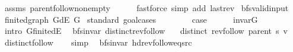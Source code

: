\begin{isabellebody}
\ assms\ parent{\isachardot}{\kern0pt}follow{\isacharunderscore}{\kern0pt}non{\isacharunderscore}{\kern0pt}empty\isanewline
\ \ \ \ \isamarkupfalse%
\ {\isacharparenleft}{\kern0pt}fastforce\ simp\ add{\isacharcolon}{\kern0pt}\ last{\isacharunderscore}{\kern0pt}rev{\isacharparenright}{\kern0pt}\isanewline
{}\isamarkupfalse%
%
\endisatagproof
{\isafoldproof}%
%
\isadelimproof
\isanewline
%
\endisadelimproof
\isanewline
{}\isamarkupfalse%
\ bfs{\isacharunderscore}{\kern0pt}valid{\isacharunderscore}{\kern0pt}input\isanewline
{}\isanewline
{}\isamarkupfalse%
\ finite{\isacharunderscore}{\kern0pt}dgraph\ {\isachardoublequoteopen}G{\isachardot}{\kern0pt}dE\ G{\isachardoublequoteclose}\isanewline
%
\isadelimproof
%
\endisadelimproof
%
\isatagproof
{}\isamarkupfalse%
\ {\isacharparenleft}{\kern0pt}standard{\isacharcomma}{\kern0pt}\ goal{\isacharunderscore}{\kern0pt}cases{\isacharparenright}{\kern0pt}\isanewline
\ \ \isamarkupfalse%
\ {}\isanewline
\ \ \isamarkupfalse%
\ {\isacharquery}{\kern0pt}case\isanewline
\ \ \ \ \isamarkupfalse%
\ invar{\isacharunderscore}{\kern0pt}G\isanewline
\ \ \ \ \isamarkupfalse%
\ {\isacharparenleft}{\kern0pt}intro\ G{\isachardot}{\kern0pt}finite{\isacharunderscore}{\kern0pt}dE{\isacharparenright}{\kern0pt}\isanewline
{}\isamarkupfalse%
%
\endisatagproof
{\isafoldproof}%
%
\isadelimproof
\isanewline
%
\endisadelimproof
{}\isamarkupfalse%
\isanewline
\isanewline
{}\isamarkupfalse%
\ {\isacharparenleft}{\kern0pt}\ bfs{\isacharunderscore}{\kern0pt}invar{\isacharparenright}{\kern0pt}\ distinct{\isacharunderscore}{\kern0pt}rev{\isacharunderscore}{\kern0pt}follow{\isacharcolon}{\kern0pt}\isanewline
\ \ \ {\isachardoublequoteopen}distinct\ {\isacharparenleft}{\kern0pt}rev{\isacharunderscore}{\kern0pt}follow\ {\isacharparenleft}{\kern0pt}parent\ s{\isacharparenright}{\kern0pt}\ v{\isacharparenright}{\kern0pt}{\isachardoublequoteclose}\isanewline
%
\isadelimproof
\ \ %
\endisadelimproof
%
\isatagproof
{}\isamarkupfalse%
\ distinct{\isacharunderscore}{\kern0pt}follow\isanewline
\ \ \isamarkupfalse%
\ simp%
\endisatagproof
{\isafoldproof}%
%
\isadelimproof
\isanewline
%
\endisadelimproof
%
\isadeliminvisible
\isanewline
%
\endisadeliminvisible
%
\isataginvisible
{}\isamarkupfalse%
\ {\isacharparenleft}{\kern0pt}\ bfs{\isacharunderscore}{\kern0pt}invar{\isacharparenright}{\kern0pt}\ hd{\isacharunderscore}{\kern0pt}rev{\isacharunderscore}{\kern0pt}follow{\isacharunderscore}{\kern0pt}eq{\isacharunderscore}{\kern0pt}src{\isacharcolon}{\kern0pt}\isanewline

\end{isabellebody}
